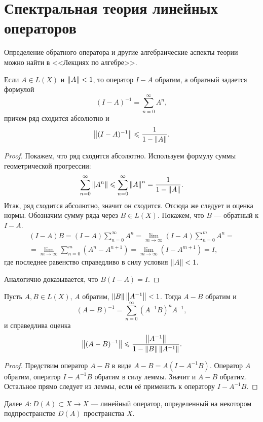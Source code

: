 \section{Спектральная теория линейных операторов}
Определение обратного оператора и другие алгебраические аспекты теории можно найти
в <<Лекциях по алгебре>>.

\begin{lemma}
    Если $A \in L(X)$ и $\left\|A\right\| < 1$, то оператор $I - A$ обратим, а обратный задается формулой
    \[ (I - A)^{-1} = \sum_{n = 0}^\infty A^n, \]
    причем ряд сходится абсолютно и
    \[ \left\|(I-A)^{-1}\right\| \leqslant \frac{1}{1-\left\|A\right\|}. \]
\end{lemma}

\begin{proof}
    Покажем, что ряд сходится абсолютно. Используем формулу суммы геометрической прогрессии:
    \[ \sum_{n=0}^\infty \left\|A^n\right\| \leqslant \sum_{n=0}^\infty \left\|A\right\|^n = \frac{1}{1-\left\|A\right\|}. \]
    Итак, ряд сходится абсолютно, значит он сходится. Отсюда же следует и оценка нормы.
    Обозначим сумму ряда через $B \in L(X)$. Покажем, что $B$ --- обратный к $I - A$.
    \begin{multline*}
        (I - A)B = (I - A)\sum_{n=0}^\infty A^n = \lim_{m\to \infty} (I - A)\sum_{n=0}^m A^n = \\
            = \lim_{m \to \infty} \sum_{n=0}^m (A^n - A^{n+1}) = \lim_{m\to \infty} (I - A^{m+1})
            = I,
    \end{multline*}
    где последнее равенство справедливо в силу условия $\left\|A\right\| < 1$.

    Аналогично доказывается, что $B(I - A) = I$.
\end{proof}

\begin{theorem}
    Пусть $A, B \in L(X)$, $A$ обратим, $\left\|B\right\|\left\|A^{-1}\right\| < 1$. Тогда $A - B$ обратим и
    \[ (A-B)^{-1} = \sum_{n=0}^\infty (A^{-1}B)^n A^{-1}, \]
    и справедлива оценка
    \[ \left\|(A-B)^{-1}\right\| \leqslant \frac{\left\|A^{-1}\right\|}{1-\left\|B\right\|\left\|A^{-1}\right\|}. \]
\end{theorem}

\begin{proof}
    Предствим оператор $A-B$ в виде $A - B = A(I-A^{-1}B)$. Оператор $A$ обратим, оператор
    $I-A^{-1}B$ обратим в силу леммы. Значит и $A - B$ обратим. Остальное прямо следует из леммы,
    если её применить к оператору $I-A^{-1}B$.
\end{proof}

Далее $A \colon D(A) \subset X \to X$ --- линейный оператор, определенный на некотором
подпространстве $D(A)$ пространства $X$.

